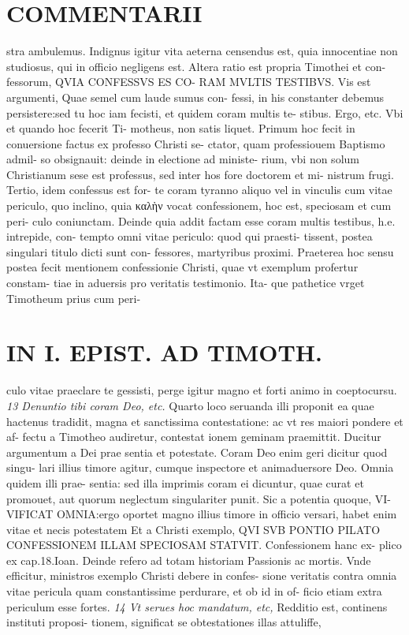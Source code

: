 \documentclass{article}
\begin{document}
\begin{pages}
\section*{COMMENTARII }
\marginpar{[ p.162 ]}\pstart stra ambulemus. Indignus igitur vita aeterna censendus est, quia innocentiae non studiosus, qui in officio negligens est.  \pend\pstart Altera ratio est propria Timothei et con- fessorum, QVIA CONFESSVS ES CO- RAM MVLTIS TESTIBVS. Vis est argumenti, Quae semel cum laude sumus con- fessi, in his constanter debemus persistere:sed tu hoc iam fecisti, et quidem coram multis te- stibus. Ergo, etc. Vbi et quando hoc fecerit Ti- motheus, non satis liquet. Primum hoc fecit in conuersione factus ex professo Christi se- ctator, quam professiouem Baptismo admil- so obsignauit: deinde in electione ad ministe- rium, vbi non solum Christianum sese est professus, sed inter hos fore doctorem et mi- nistrum frugi. Tertio, idem confessus est for- te coram tyranno aliquo vel in vinculis cum vitae periculo, quo inclino, quia καλὴν vocat confessionem, hoc est, speciosam et cum peri- culo coniunctam. Deinde quia addit factam esse coram multis testibus, h.e. intrepide, con- tempto omni vitae periculo: quod qui praesti- tissent, postea singulari titulo dicti sunt con- fessores, martyribus proximi. Praeterea hoc sensu postea fecit mentionem confessionie Christi, quae vt exemplum profertur constam- tiae in aduersis pro veritatis testimonio. Ita- que pathetice vrget Timotheum prius cum peri-  \pend
\section*{IN I. EPIST. AD TIMOTH. }
\marginpar{[ p.163 ]}\pstart culo vitae praeclare te gessisti, perge igitur magno et forti animo in coeptocursu.  \pend
\textit{13 Denuntio tibi coram Deo, etc. }\pstart Quarto loco seruanda illi proponit ea quae hactenus tradidit, magna et sanctissima contestatione: ac vt res maiori pondere et af- fectu a Timotheo audiretur, contestat ionem geminam praemittit. Ducitur argumentum a Dei prae sentia et potestate.  \pend\pstart Coram Deo enim geri dicitur quod singu- lari illius timore agitur, cumque inspectore et animaduersore Deo. Omnia quidem illi prae- sentia: sed illa imprimis coram ei dicuntur, quae curat et promouet, aut quorum neglectum singulariter punit. Sic a potentia quoque, VI- VIFICAT OMNIA:ergo oportet magno illius timore in officio versari, habet enim vitae et necis potestatem Et a Christi exemplo, QVI SVB PONTIO PILATO CONFESSIONEM ILLAM SPECIOSAM STATVIT. Confessionem hanc ex- plico ex cap.18.Ioan. Deinde refero ad totam historiam Passionis ac mortis. Vnde efficitur, ministros exemplo Christi debere in confes- sione veritatis contra omnia vitae pericula quam constantissime perdurare, et ob id in of- ficio etiam extra periculum esse fortes.  \pend
\textit{14 Vt serues hoc mandatum, etc, }\pstart Redditio est, continens instituti proposi- tionem, significat se obtestationes illas attuliffe,  \pend

\end{pages}
\end{document}
